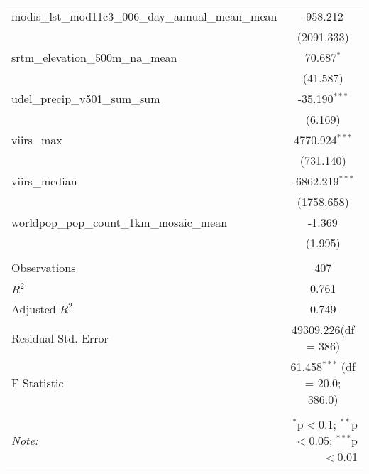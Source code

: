 \begin{table}[!htbp]
\begin{tabular}{@{\extracolsep{5pt}}lc}
 modis_lst_mod11c3_006_day_annual_mean_mean & -958.212$^{}$ \\
  & (2091.333) \\
 srtm_elevation_500m_na_mean & 70.687$^{*}$ \\
  & (41.587) \\
 udel_precip_v501_sum_sum & -35.190$^{***}$ \\
  & (6.169) \\
 viirs_max & 4770.924$^{***}$ \\
  & (731.140) \\
 viirs_median & -6862.219$^{***}$ \\
  & (1758.658) \\
 worldpop_pop_count_1km_mosaic_mean & -1.369$^{}$ \\
  & (1.995) \\
\hline \\[-1.8ex]
 Observations & 407 \\
 $R^2$ & 0.761 \\
 Adjusted $R^2$ & 0.749 \\
 Residual Std. Error & 49309.226(df = 386)  \\
 F Statistic & 61.458$^{***}$ (df = 20.0; 386.0) \\
\hline
\hline \\[-1.8ex]
\textit{Note:} & \multicolumn{1}{r}{$^{*}$p$<$0.1; $^{**}$p$<$0.05; $^{***}$p$<$0.01} \\
\end{tabular}
\end{table}
